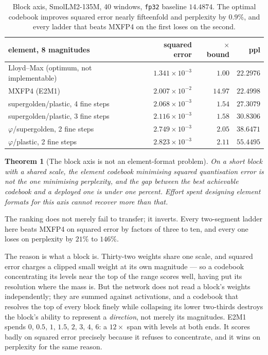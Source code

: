 \documentclass[11pt]{article}
\newtheorem{theorem}{Theorem}
\theoremstyle{definition}
\begin{document}
\begin{table}[t]\centering
\caption{Block axis, SmolLM2-135M, 40 windows, \texttt{fp32} baseline $14.4874$.
The optimal codebook improves squared error nearly fifteenfold and perplexity by
$0.9\%$, and every ladder that beats MXFP4 on the first loses on the second.}
\label{tab:blockbound}
\begin{tabular}{lrrr}
\toprule
element, 8 magnitudes & squared error & $\times$ bound & ppl \\
\midrule
Lloyd--Max (optimum, not implementable) & $1.341\!\times\!10^{-3}$ & $1.00$ & $\mathbf{22.2976}$ \\
MXFP4 (E2M1)                            & $2.007\!\times\!10^{-2}$ & $14.97$ & $\mathbf{22.4998}$ \\
supergolden/plastic, 4 fine steps       & $2.068\!\times\!10^{-3}$ & $1.54$ & $27.3079$ \\
supergolden/plastic, 3 fine steps       & $2.116\!\times\!10^{-3}$ & $1.58$ & $30.8306$ \\
$\varphi$/supergolden, 2 fine steps     & $2.749\!\times\!10^{-3}$ & $2.05$ & $38.6471$ \\
$\varphi$/plastic, 2 fine steps         & $2.823\!\times\!10^{-3}$ & $2.11$ & $55.4495$ \\
\bottomrule
\end{tabular}
\end{table}

\begin{theorem}[The block axis is not an element-format problem]\label{thm:block}
On a short block with a shared scale, the element codebook minimising squared
quantisation error is not the one minimising perplexity, and the gap between the
best achievable codebook and a deployed one is under one percent. Effort spent
designing element formats for this axis cannot recover more than that.
\end{theorem}

The ranking does not merely fail to transfer; it inverts. Every two-segment
ladder here beats MXFP4 on squared error by factors of three to ten, and every
one loses on perplexity by $21\%$ to $146\%$.

The reason is what a block is. Thirty-two weights share one scale, and squared
error charges a clipped small weight at its own magnitude --- so a codebook
concentrating its levels near the top of the range scores well, having put its
resolution where the mass is. But the network does not read a block's weights
independently; they are summed against activations, and a codebook that
resolves the top of every block finely while collapsing its lower two-thirds
destroys the block's ability to represent a \emph{direction}, not merely its
magnitudes. E2M1 spends $0,\,0.5,\,1,\,1.5,\,2,\,3,\,4,\,6$: a $12\times$ span
with levels at both ends. It scores badly on squared error precisely because it
refuses to concentrate, and it wins on perplexity for the same reason.
\end{document}
